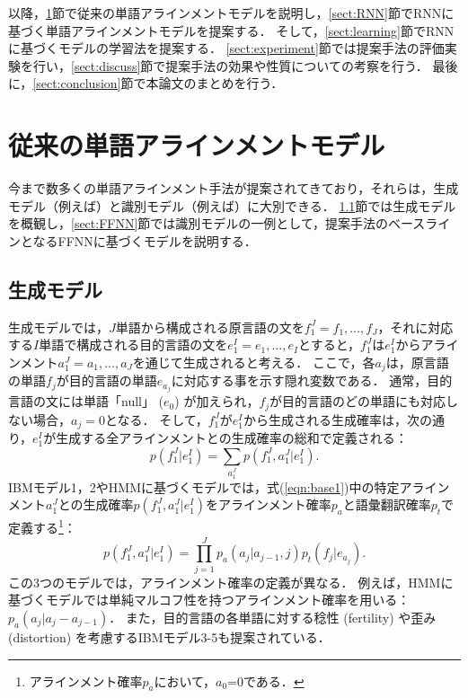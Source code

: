 \documentclass[japanese]{jnlp_1.4}
\begin{document}
以降，\ref{sect:related}節で従来の単語アラインメントモデルを説明し，\ref{sect:RNN}節でRNNに基づく単語アラインメントモデルを提案する．
そして，\ref{sect:learning}節でRNNに基づくモデルの学習法を提案する．
\ref{sect:experiment}節では提案手法の評価実験を行い，\ref{sect:discuss}節で提案手法の効果や性質についての考察を行う．
最後に，\ref{sect:conclusion}節で本論文のまとめを行う．


\section{従来の単語アラインメントモデル}
\label{sect:related}

今まで数多くの単語アラインメント手法が提案されてきており，それらは，生成モデル（例えば\cite{brown93,vogel96,och03}）と識別モデル（例えば\cite{taskar05,moore05,blunsom06}）に大別できる．
\ref{sect:SWA}節では生成モデルを概観し，\ref{sect:FFNN}節では識別モデルの一例として，提案手法のベースラインとなるFFNNに基づくモデル\cite{yang13}を説明する．


\subsection{生成モデル}
\label{sect:SWA}

生成モデルでは，$J$単語から構成される原言語の文を$f_{1}^{J}=f_{1},\ldots,f_{J}$，それに対応する$I$単語で構成される目的言語の文を$e_{1}^{I}=e_{1},\ldots,e_{I}$とすると，$f_{1}^{J}$は$e_{1}^{I}$からアラインメント$a_{1}^{J}=a_{1},\ldots,a_{J}$を通じて生成されると考える．
ここで，各$a_{j}$は，原言語の単語$f_{j}$が目的言語の単語$e_{a_{j}}$に対応する事を示す隠れ変数である．
通常，目的言語の文には単語「null」 ($e_{0}$) が加えられ，$f_{j}$が目的言語のどの単語にも対応しない場合，$a_{j} = 0$となる．
そして，$f_{1}^{J}$が$e_{1}^{I}$から生成される生成確率は，次の通り，$e_{1}^{I}$が生成する全アラインメントとの生成確率の総和で定義される：
\begin{equation}
\label{eqn:base1}
p(f_{1}^{J}|e_{1}^{I})=\sum_{a_{1}^{J}}p(f_{1}^{J},a_{1}^{J}|e_{1}^{I}). 
\end{equation}
IBMモデル1，2やHMMに基づくモデルでは，式(\ref{eqn:base1})中の特定アラインメント$a_{1}^{J}$との生成確率$p(f_{1}^{J},a_{1}^{J}|e_{1}^{I})$をアラインメント確率$p_{a}$と語彙翻訳確率$p_{t}$で定義する\footnote{アラインメント確率$p_{a}$において，$a_{0}$=0である．}：
\begin{equation}
\label{eqn:base2}
p(f_{1}^{J},a_{1}^{J}|e_{1}^{I}) = \prod_{j=1}^{J}p_a(a_{j}|a_{j-1},j)p_t(f_{j}|e_{a_{j}}).
\end{equation}
この3つのモデルでは，アラインメント確率の定義が異なる．
例えば，HMMに基づくモデルでは単純マルコフ性を持つアラインメント確率を用いる：$p_a(a_{j}|a_{j}-a_{j-1})$．
また，目的言語の各単語に対する稔性 (fertility) や歪み (distortion) を考慮するIBMモデル3-5も提案されている．
\end{document}
